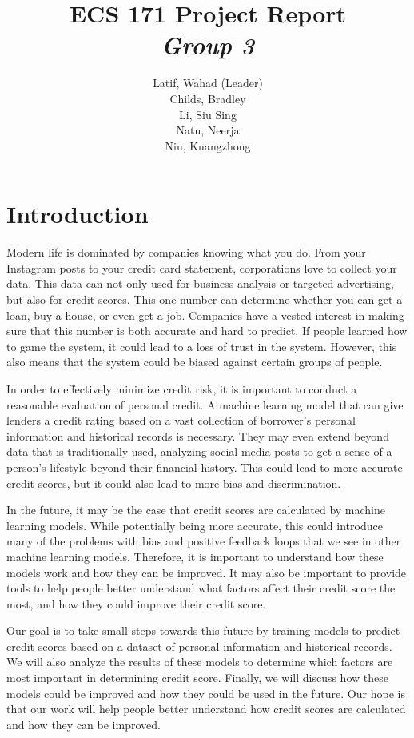 \documentclass[12pt,twocolumn]{article}
\title{ECS 171 Project Report\\\textit{Group 3}}
\author{Latif, Wahad (Leader)\\ Childs, Bradley\\Li, Siu Sing\\Natu, Neerja\\Niu, Kuangzhong}
\begin{document}
\maketitle
\tableofcontents
\newpage
\section{Introduction}
Modern life is dominated by companies knowing what you do. From your Instagram posts to your credit card statement, corporations love to collect your data. This data can not only used for business analysis or targeted advertising, but also for credit scores. This one number can determine whether you can get a loan, buy a house, or even get a job. Companies have a vested interest in making sure that this number is both accurate and hard to predict. If people learned how to game the system, it could lead to a loss of trust in the system. However, this also means that the system could be biased against certain groups of people.

In order to effectively minimize credit risk, it is important to conduct a reasonable evaluation of personal credit. A machine learning model that can give lenders a credit rating based on a vast collection of borrower's personal information and historical records is necessary. They may even extend beyond data that is traditionally used, analyzing social media posts to get a sense of a person's lifestyle beyond their financial history. This could lead to more accurate credit scores, but it could also lead to more bias and discrimination.

In the future, it may be the case that credit scores are calculated  by machine learning models. While potentially being more accurate, this could introduce many of the problems with bias and positive feedback loops that we see in other machine learning models. Therefore, it is important to understand how these models work and how they can be improved. It may also be important to provide tools to help people better understand what factors affect their credit score the most, and how they could improve their credit score.

Our goal is to take small steps towards this future by training models to predict credit scores based on a dataset of personal information and historical records. We will also analyze the results of these models to determine which factors are most important in determining credit score. Finally, we will discuss how these models could be improved and how they could be used in the future. Our hope is that our work will help people better understand how credit scores are calculated and how they can be improved.
\end{document}
